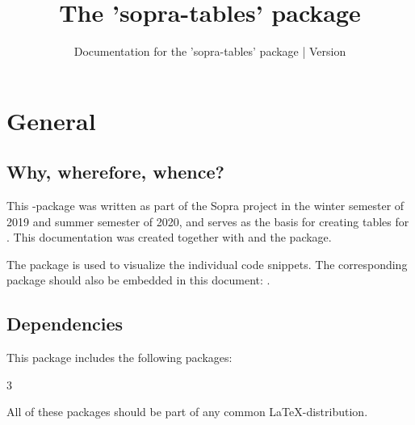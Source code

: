 \documentclass{sopra-base}
\title{The 'sopra-tables' package}
\subtitle[Documentation for the 'sopra-tables' package]{Documentation for the 'sopra-tables' package | Version \thesotversion}
\begin{document}
    \maketitle%
%
%

%
%
%
%

\section{General}
\subsection{Why, wherefore, whence?}
    This \LaTeXe-package was written as part of the Sopra project in the
    winter semester of 2019 and summer semester of 2020, and serves as the
    basis for creating tables
    for . This documentation was created together with
     and the  package.\par
    The  package is used to visualize the
    individual code snippets.
    The corresponding package should also be embedded in this document: .
\subsection{Dependencies}
    This package includes the following packages:
    \begin{multicols}{3}
    \end{multicols}
    All of these packages should be part of any common \LaTeX-distribution.
\end{document}
